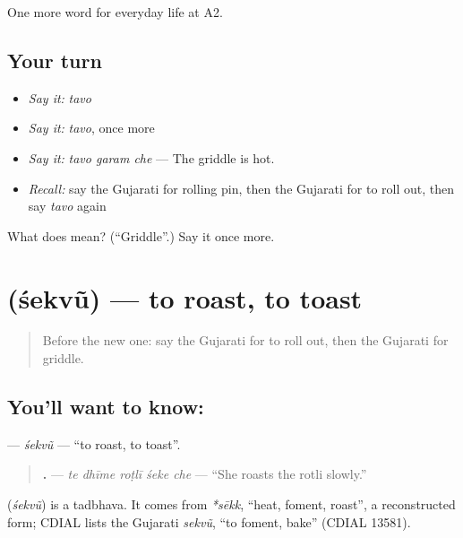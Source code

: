 \begin{grammarlens}[title={What you've built}]
One more word for everyday life at A2.
\end{grammarlens}

\subsection*{Your turn}
\begin{itemize}
\raggedright
  \item \emph{Say it:} \emph{tavo}
  \item \emph{Say it:} \emph{tavo}, once more
  \item \emph{Say it:} \emph{tavo garam che} — The griddle is hot.
  \item \emph{Recall:} say the Gujarati for rolling pin, then the Gujarati for to roll out, then say \emph{tavo} again
\end{itemize}

\begin{tcolorbox}[breakable,colback=teal!4,colframe=teal!35!black,title={Before you move on}]
What does  mean? (\textquotedblleft{}Griddle\textquotedblright{}.) Say it once more.
\end{tcolorbox}
\section[\texorpdfstring{\gu{શેકવું} (śekvũ)}{શેકવું (śekvũ)}]{ (śekvũ) — to roast, to toast}

\label{lesson:GU-C168-sekvu}



\begin{quote}
Before the new one: say the Gujarati for to roll out, then the Gujarati for griddle.
\end{quote}

\subsection*{You'll want to know: }
\textbf{} — \emph{śekvũ} — \textquotedblleft{}to roast, to toast\textquotedblright{}.

\begin{quote}
\textbf{    .} — \emph{te dhīme roṭlī śeke che} — \textquotedblleft{}She roasts the rotli slowly.\textquotedblright{}
\end{quote}

\begin{cousinweb}
\textbf{} (\emph{śekvũ}) is a tadbhava. It comes from \emph{*sēkk}, \textquotedblleft{}heat, foment, roast\textquotedblright{}, a reconstructed form; CDIAL lists the Gujarati \emph{sekvũ}, \textquotedblleft{}to foment, bake\textquotedblright{} (CDIAL 13581).
\end{cousinweb}

